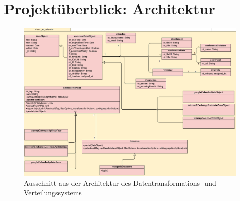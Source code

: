 \section{Projektüberblick: Architektur}

\begin{figure}
	\centering
	\includegraphics[width=\textwidth]{pics/architecture.png}	
	\caption{Ausschnitt aus der Architektur des Datentransformations- und Verteilungssystems}
	\label{fig:architectur}
\end{figure}

